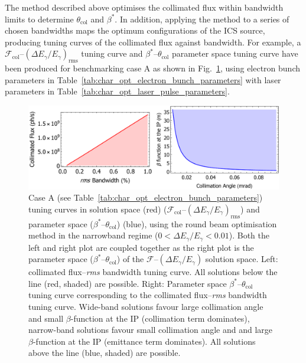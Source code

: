 \documentclass[../main.tex]{subfiles}
\begin{document}
The method described above optimises the collimated flux within bandwidth limits to determine $\theta_{\mathrm{col}}$ and $\beta^{*}$. In addition, applying the method to a series of chosen bandwidths maps the optimum configurations of the ICS source, producing tuning curves of the collimated flux against bandwidth. For example, a $\mathcal{F}_{\mathrm{col}}$--$\left(\Delta E_{\gamma}/E_{\gamma}\right)_{\mathrm{rms}}$ tuning curve and  $\beta^{*}$--$\theta_{\mathrm{col}}$ parameter space tuning curve have been produced for benchmarking case A as shown in Fig.~\ref{fig:CaseA_RB_tuning_curve}, using electron bunch parameters in Table~\ref{tab:char_opt_electron_bunch_parameters} with laser parameters in Table~\ref{tab:char_opt_laser_pulse_parameters}. 
\begin{figure}[!h]
\centering
\includegraphics[width=\textwidth]{Figures/Optimisation_and_Characterisation_of_Inverse_Compton_Scattering_Sources/Case_A_RB_Tuning_Curves.pdf}
\caption{Case A (see Table~\ref{tab:char_opt_electron_bunch_parameters}) tuning curves in solution space (red) ($\mathcal{F}_{\mathrm{col}}$--$\left(\Delta E_{\gamma}/E_{\gamma}\right)_{\mathrm{rms}}$) and parameter space ($\beta^{*}$--$\theta_{\mathrm{col}}$) (blue), using the round beam optimisation method in the narrowband regime ($0 < \Delta E_{\gamma}/E_{\gamma} < 0.01$). Both the left and right plot are coupled together as the right plot is the parameter space ($\beta^{*}$--$\theta_{\mathrm{col}}$) of the $\mathcal{F}$--$\left(\Delta E_{\gamma}/E_{\gamma}\right)$ solution space. Left: collimated flux--\textit{rms} bandwidth tuning curve. All solutions below the line (red, shaded) are possible. Right: Parameter space $\beta^{*}$--$\theta_{\mathrm{col}}$ tuning curve corresponding to the collimated flux--\textit{rms} bandwidth tuning curve. Wide-band solutions favour large collimation angle and small $\beta$-function at the IP (collimation term dominates), narrow-band solutions favour small collimation angle and and large $\beta$-function at the IP (emittance term dominates). All solutions above the line (blue, shaded) are possible. }
\label{fig:CaseA_RB_tuning_curve}
\end{figure}
\end{document}
